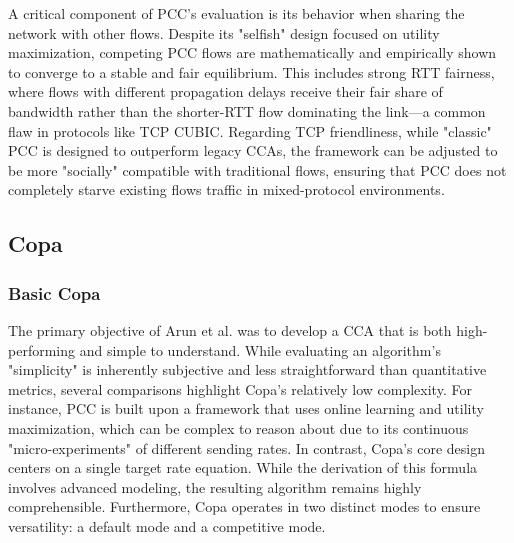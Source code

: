 A critical component of PCC's evaluation is its behavior when sharing the network with other flows. 
Despite its "selfish" design focused on utility maximization, competing PCC flows are mathematically and empirically shown to converge to a stable and fair equilibrium\cite{PCC}. 
This includes strong RTT fairness, where flows with different propagation delays receive their fair share of bandwidth rather than the shorter-RTT flow dominating the link—a common flaw in protocols like TCP CUBIC. 
Regarding TCP friendliness, while "classic" PCC is designed to outperform legacy \acs{CCA}s, the framework can be adjusted to be more "socially" compatible with traditional flows, ensuring that PCC does not completely starve existing flows traffic in mixed-protocol environments.

\subsection{Copa}

\subsubsection{Basic Copa}

The primary objective of Arun et al. \cite{COPA} was to develop a \acs{CCA} that is both high-performing and simple to understand. 
While evaluating an algorithm's "simplicity" is inherently subjective and less straightforward than quantitative metrics, several comparisons highlight Copa's relatively low complexity.  
For instance, PCC is built upon a framework that uses online learning and utility maximization, which can be complex to reason about due to its continuous "micro-experiments" of different sending rates. 
In contrast, Copa's core design centers on a single target rate equation.%
While the derivation of this formula involves advanced modeling, the resulting algorithm remains highly comprehensible.  
Furthermore, Copa operates in two distinct modes to ensure versatility: a default mode and a competitive mode. 


